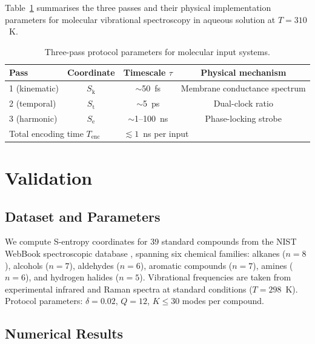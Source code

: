 \documentclass[11pt,twocolumn,a4paper]{article}
\theoremstyle{definition}
\theoremstyle{remark}
\newcommand{\Sk}{S_{\mathrm{k}}}
\newcommand{\St}{S_{\mathrm{t}}}
\newcommand{\Se}{S_{\mathrm{e}}}
\begin{document}
Table~\ref{tab:throughput} summarises the three passes and their physical
implementation parameters for molecular vibrational spectroscopy in aqueous
solution at $T = 310$~K.

\begin{table}[h]
\centering
\small
\caption{Three-pass protocol parameters for molecular input systems.}
\label{tab:throughput}
\setlength{\tabcolsep}{4pt}
\begin{tabular}{lccc}
\toprule
Pass & Coordinate & Timescale $\tau$ & Physical mechanism \\
\midrule
1 (kinematic)  & $\Sk$ & $\sim$50~fs  & Membrane conductance spectrum \\
2 (temporal)   & $\St$ & $\sim$5~ps   & Dual-clock ratio \\
3 (harmonic)   & $\Se$ & $\sim$1--100~ns & Phase-locking strobe \\
\midrule
\multicolumn{2}{l}{Total encoding time $T_{\mathrm{enc}}$} & \multicolumn{2}{l}{$\lesssim 1$~ns per input} \\
\bottomrule
\end{tabular}
\end{table}

\section{Validation}
\label{sec:validation}

\subsection{Dataset and Parameters}

We compute S-entropy coordinates for 39 standard compounds from the
NIST WebBook spectroscopic database \citep{nist2023}, spanning six chemical
families: alkanes ($n=8$), alcohols ($n=7$), aldehydes ($n=6$), aromatic
compounds ($n=7$), amines ($n=6$), and hydrogen halides ($n=5$). Vibrational
frequencies are taken from experimental infrared and Raman spectra at standard
conditions ($T = 298$~K). Protocol parameters: $\delta = 0.02$, $Q = 12$,
$K \leq 30$ modes per compound.

\subsection{Numerical Results}
\end{document}
